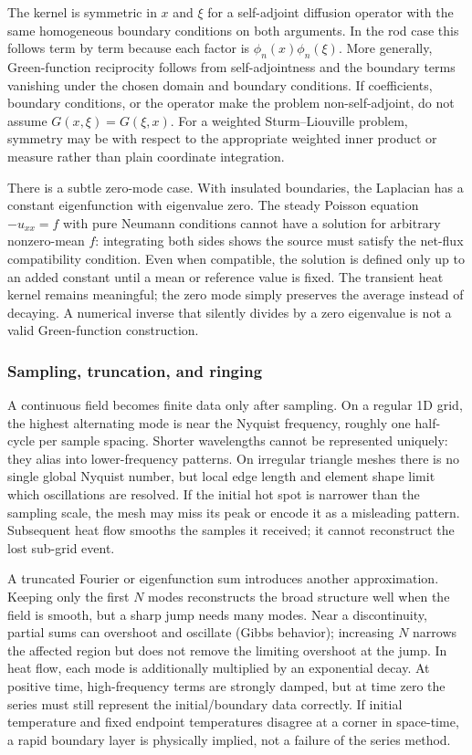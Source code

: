 The kernel is symmetric in \(x\) and \(\xi\) for a self-adjoint diffusion operator with the same homogeneous boundary conditions on both arguments. In the rod case this follows term by term because each factor is \(\phi_n(x)\phi_n(\xi)\). More generally, Green-function reciprocity follows from self-adjointness and the boundary terms vanishing under the chosen domain and boundary conditions. If coefficients, boundary conditions, or the operator make the problem non-self-adjoint, do not assume \(G(x,\xi)=G(\xi,x)\). For a weighted Sturm--Liouville problem, symmetry may be with respect to the appropriate weighted inner product or measure rather than plain coordinate integration.

There is a subtle zero-mode case. With insulated boundaries, the Laplacian has a constant eigenfunction with eigenvalue zero. The steady Poisson equation \(-u_{xx}=f\) with pure Neumann conditions cannot have a solution for arbitrary nonzero-mean \(f\): integrating both sides shows the source must satisfy the net-flux compatibility condition. Even when compatible, the solution is defined only up to an added constant until a mean or reference value is fixed. The transient heat kernel remains meaningful; the zero mode simply preserves the average instead of decaying. A numerical inverse that silently divides by a zero eigenvalue is not a valid Green-function construction.

\subsubsection{Sampling, truncation, and ringing}\label{02-foundations-ii-ch025-sampling-truncation-and-ringing}

\hypertarget{02-foundations-ii-ch025-sampling-truncation-and-ringing}{}

A continuous field becomes finite data only after sampling. On a regular 1D grid, the highest alternating mode is near the Nyquist frequency, roughly one half-cycle per sample spacing. Shorter wavelengths cannot be represented uniquely: they alias into lower-frequency patterns. On irregular triangle meshes there is no single global Nyquist number, but local edge length and element shape limit which oscillations are resolved. If the initial hot spot is narrower than the sampling scale, the mesh may miss its peak or encode it as a misleading pattern. Subsequent heat flow smooths the samples it received; it cannot reconstruct the lost sub-grid event.

A truncated Fourier or eigenfunction sum introduces another approximation. Keeping only the first \(N\) modes reconstructs the broad structure well when the field is smooth, but a sharp jump needs many modes. Near a discontinuity, partial sums can overshoot and oscillate (Gibbs behavior); increasing \(N\) narrows the affected region but does not remove the limiting overshoot at the jump. In heat flow, each mode is additionally multiplied by an exponential decay. At positive time, high-frequency terms are strongly damped, but at time zero the series must still represent the initial/boundary data correctly. If initial temperature and fixed endpoint temperatures disagree at a corner in space-time, a rapid boundary layer is physically implied, not a failure of the series method.

